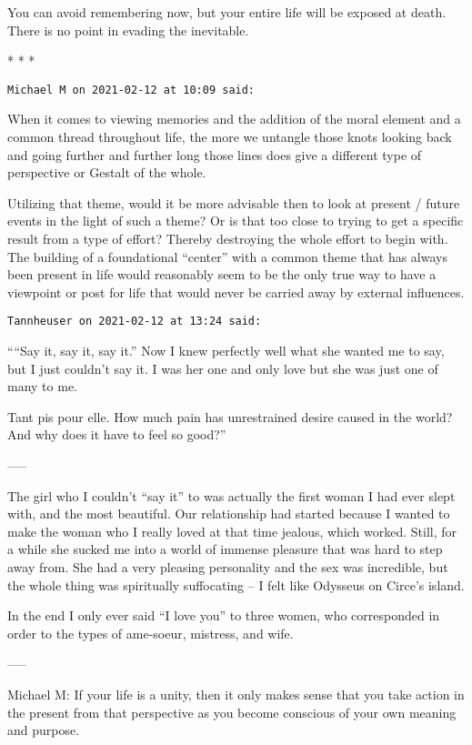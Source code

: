 You can avoid remembering now, but your entire life will be exposed at death. There is no point in evading the inevitable.




\begin{center}* * *\end{center}

\begin{footnotesize}\begin{sffamily}



\texttt{Michael M on 2021-02-12 at 10:09 said: }

When it comes to viewing memories and the addition of the moral element and a common thread throughout life, the more we untangle those knots looking back and going further and further long those lines does give a different type of perspective or Gestalt of the whole. 

Utilizing that theme, would it be more advisable then to look at present / future events in the light of such a theme? Or is that too close to trying to get a specific result from a type of effort? Thereby destroying the whole effort to begin with. The building of a foundational “center” with a common theme that has always been present in life would reasonably seem to be the only true way to have a viewpoint or post for life that would never be carried away by external influences.


\hfill

\texttt{Tannheuser on 2021-02-12 at 13:24 said: }

““Say it, say it, say it.” Now I knew perfectly well what she wanted me to say, but I just couldn't say it. I was her one and only love but she was just one of many to me.

Tant pis pour elle. How much pain has unrestrained desire caused in the world? And why does it have to feel so good?”

—–

The girl who I couldn't “say it” to was actually the first woman I had ever slept with, and the most beautiful. Our relationship had started because I wanted to make the woman who I really loved at that time jealous, which worked. Still, for a while she sucked me into a world of immense pleasure that was hard to step away from. She had a very pleasing personality and the sex was incredible, but the whole thing was spiritually suffocating – I felt like Odysseus on Circe's island. 

In the end I only ever said “I love you” to three women, who corresponded in order to the types of ame-soeur, mistress, and wife.

—–

Michael M: If your life is a unity, then it only makes sense that you take action in the present from that perspective as you become conscious of your own meaning and purpose.


\end{sffamily}\end{footnotesize}
